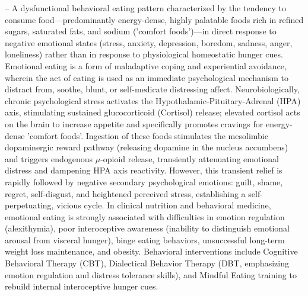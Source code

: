 -- A dysfunctional behavioral eating pattern characterized by the tendency to consume food—predominantly energy-dense, highly palatable foods rich in refined sugars, saturated fats, and sodium ('comfort foods')—in direct response to negative emotional states (stress, anxiety, depression, boredom, sadness, anger, loneliness) rather than in response to physiological homeostatic hunger cues. Emotional eating is a form of maladaptive coping and experiential avoidance, wherein the act of eating is used as an immediate psychological mechanism to distract from, soothe, blunt, or self-medicate distressing affect. Neurobiologically, chronic psychological stress activates the Hypothalamic-Pituitary-Adrenal (HPA) axis, stimulating sustained glucocorticoid (Cortisol) release; elevated cortisol acts on the brain to increase appetite and specifically promotes cravings for energy-dense 'comfort foods'. Ingestion of these foods stimulates the mesolimbic dopaminergic reward pathway (releasing dopamine in the nucleus accumbens) and triggers endogenous $\mu$-opioid release, transiently attenuating emotional distress and dampening HPA axis reactivity. However, this transient relief is rapidly followed by negative secondary psychological emotions: guilt, shame, regret, self-disgust, and heightened perceived stress, establishing a self-perpetuating, vicious cycle. In clinical nutrition and behavioral medicine, emotional eating is strongly associated with difficulties in emotion regulation (alexithymia), poor interoceptive awareness (inability to distinguish emotional arousal from visceral hunger), binge eating behaviors, unsuccessful long-term weight loss maintenance, and obesity. Behavioral interventions include Cognitive Behavioral Therapy (CBT), Dialectical Behavior Therapy (DBT, emphasizing emotion regulation and distress tolerance skills), and Mindful Eating training to rebuild internal interoceptive hunger cues.

